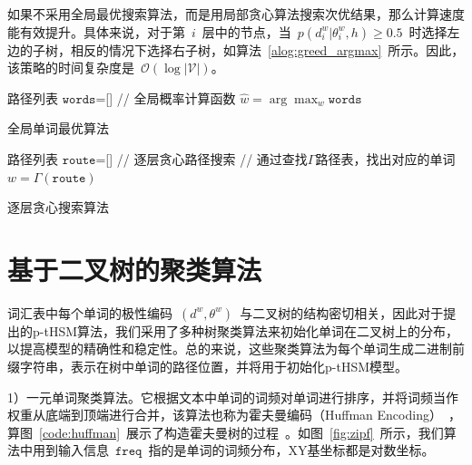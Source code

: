 如果不采用全局最优搜索算法，而是用局部贪心算法搜索次优结果，那么计算速度能有效提升。具体来说，对于第~$i$~层中的节点，当~$p(d^w_i|\theta_{i}^w,h)\ge 0.5$~时选择左边的子树，相反的情况下选择右子树，如算法~\ref{alog:greed_argmax}~所示。因此，该策略的时间复杂度是~$\mathcal{O}(\log\mathcal{|V|})$。

\begin{algorithm}[!ht]
\SetAlgoLined
{}
 路径列表 $\mathtt{words}$=[] \;
{// 全局概率计算函数}\;
{$\hat w=\arg\max_w{\mathtt{words}}$}\;
\caption{全局单词最优算法}\label{alog:global}
\end{algorithm}

\begin{algorithm}[!ht]
\SetAlgoLined
{}
 路径列表 $\mathtt{route}$=[] \;
 {// 逐层贪心路径搜索}\;
{// 通过查找$\Gamma$路径表，找出对应的单词}\;
$w=\Gamma(\mathtt{route})$\;
\caption{逐层贪心搜索算法\label{alog:greed_argmax}}
\end{algorithm}



\section{基于二叉树的聚类算法}
词汇表中每个单词的极性编码~$(d^w,\theta^w)$~与二叉树的结构密切相关，因此对于提出的p-tHSM算法，我们采用了多种树聚类算法来初始化单词在二叉树上的分布，以提高模型的精确性和稳定性。总的来说，这些聚类算法为每个单词生成二进制前缀字符串，表示在树中单词的路径位置，并将用于初始化p-tHSM模型。


1）一元单词聚类算法。它根据文本中单词的词频对单词进行排序，并将词频当作权重从底端到顶端进行合并，该算法也称为霍夫曼编码（Huffman Encoding）~，算图~\ref{code:huffman}~展示了构造霍夫曼树的过程~。如图~\ref{fig:zipf}~所示，我们算法中用到输入信息~$\texttt{freq}$~指的是单词的词频分布，XY基坐标都是对数坐标。


